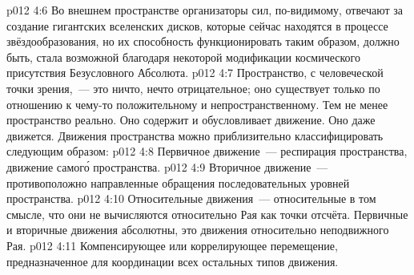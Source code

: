 \vs p012 4:6 \pc Во внешнем пространстве организаторы сил, по\hyp{}видимому, отвечают за создание гигантских вселенских дисков, которые сейчас находятся в процессе звёздообразования, но их способность функционировать таким образом, должно быть, стала возможной благодаря некоторой модификации космического присутствия Безусловного Абсолюта.
\vs p012 4:7 \pc Пространство, с человеческой точки зрения,~--- это ничто, нечто отрицательное; оно существует только по отношению к чему\hyp{}то положительному и непространственному. Тем не менее пространство реально. Оно содержит и обусловливает движение. Оно даже движется. Движения пространства можно приблизительно классифицировать следующим образом:
\vs p012 4:8 Первичное движение~--- респирация пространства, движение самог\'о пространства.
\vs p012 4:9 Вторичное движение~--- противоположно направленные обращения последовательных уровней пространства.
\vs p012 4:10 Относительные движения~--- относительные в том смысле, что они не вычисляются относительно Рая как точки отсчёта. Первичные и вторичные движения абсолютны, это движения относительно неподвижного Рая.
\vs p012 4:11 Компенсирующее или коррелирующее перемещение, предназначенное для координации всех остальных типов движения.
